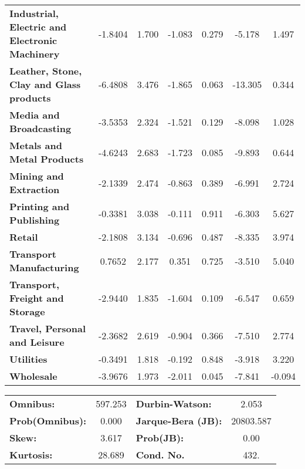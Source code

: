 \documentclass[ 11pt]{article}
\begin{document}
\begin{center}
\begin{tabular}{lcccccc}
\textbf{Industrial, Electric and Electronic Machinery} &      -1.8404  &        1.700     &    -1.083  &         0.279        &       -5.178    &        1.497     \\
\textbf{Leather, Stone, Clay and Glass products}       &      -6.4808  &        3.476     &    -1.865  &         0.063        &      -13.305    &        0.344     \\
\textbf{Media and Broadcasting}                        &      -3.5353  &        2.324     &    -1.521  &         0.129        &       -8.098    &        1.028     \\
\textbf{Metals and Metal Products}                     &      -4.6243  &        2.683     &    -1.723  &         0.085        &       -9.893    &        0.644     \\
\textbf{Mining and Extraction}                         &      -2.1339  &        2.474     &    -0.863  &         0.389        &       -6.991    &        2.724     \\
\textbf{Printing and Publishing}                       &      -0.3381  &        3.038     &    -0.111  &         0.911        &       -6.303    &        5.627     \\
\textbf{Retail}                                        &      -2.1808  &        3.134     &    -0.696  &         0.487        &       -8.335    &        3.974     \\
\textbf{Transport Manufacturing}                       &       0.7652  &        2.177     &     0.351  &         0.725        &       -3.510    &        5.040     \\
\textbf{Transport, Freight and Storage}                &      -2.9440  &        1.835     &    -1.604  &         0.109        &       -6.547    &        0.659     \\
\textbf{Travel, Personal and Leisure}                  &      -2.3682  &        2.619     &    -0.904  &         0.366        &       -7.510    &        2.774     \\
\textbf{Utilities}                                     &      -0.3491  &        1.818     &    -0.192  &         0.848        &       -3.918    &        3.220     \\
\textbf{Wholesale}                                     &      -3.9676  &        1.973     &    -2.011  &         0.045        &       -7.841    &       -0.094     \\
\bottomrule
\end{tabular}
\begin{tabular}{lclc}
\textbf{Omnibus:}       & 597.253 & \textbf{  Durbin-Watson:     } &     2.053  \\
\textbf{Prob(Omnibus):} &   0.000 & \textbf{  Jarque-Bera (JB):  } & 20803.587  \\
\textbf{Skew:}          &   3.617 & \textbf{  Prob(JB):          } &      0.00  \\
\textbf{Kurtosis:}      &  28.689 & \textbf{  Cond. No.          } &      432.  \\
\bottomrule
\end{tabular}
\end{center}
\end{document}
